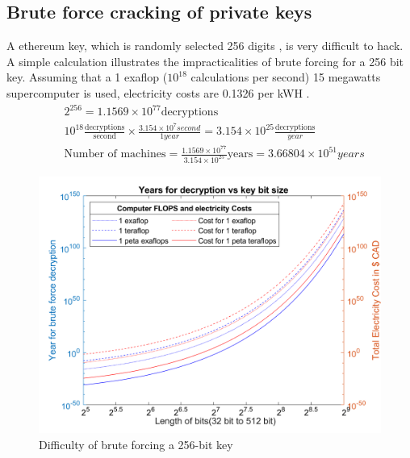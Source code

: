 \documentclass[12pt]{scrreprt}
\begin{document}
\subsection{Brute force cracking of private keys}
A ethereum key, which is randomly selected 256 digits \cite{ethereumWhitePaper:Online}, is very difficult to hack. A simple calculation illustrates the impracticalities of brute forcing for a 256 bit key. Assuming that a 1 exaflop ($10^{18}$ calculations per second) 15 megawatts supercomputer \cite{Service617} is used, electricity costs are 0.1326 per kWH \cite{BCHydroRates}. %
\vspace*{-0.1cm}
\begin{align}
& 2^{256} = 1.1569 \times 10^{77} \text{decryptions} \\
& 10^{18} \frac{\text{decryptions}}{\text{second}} \times \frac{3.154 \times 10^7 second}{1 year} = 3.154 \times 10^{25} \frac{\text{decryptions}}{year} \\
& \text{Number of machines} = \frac{1.1569 \times 10^{77} }{3.154 \times 10^{25} } \text{years}= 3.66804 \times 10^{51} years
\end{align}

 	\begin{figure}[ht]
  	\centering 
  	\includegraphics[width=0.7\linewidth]{matlab/epicPic.png}
  	\caption{Difficulty of brute forcing a 256-bit key}
  	\label{security:fig2}
  	\end{figure}
 
 	
\end{document}
